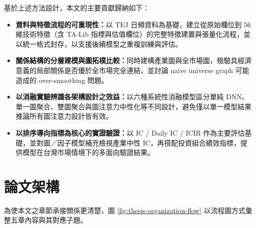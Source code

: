 基於上述方法設計，本文的主要貢獻歸納如下：
\begin{itemize}
    \item \textbf{資料與特徵流程的可重現性：}以 TEJ 日頻資料為基礎，建立從原始欄位到 56 維技術特徵（含 TA-Lib 指標與估值欄位）的完整特徵建置與張量化流程，並以統一格式封存，以支援後續模型之重複訓練與評估。
    \item \textbf{關係結構的分層建模與圖拓樸比較：}同時建構產業圖與全市場圖，檢驗具經濟意義的局部關係是否優於全市場完全連結，並討論 naive universe graph 可能造成的 over-smoothing 問題。
    \item \textbf{以消融實驗辨識各架構設計之效益：}以六種系統性消融模型區分單純 DNN、單一圖聚合、雙圖聚合與圖注意力中性化等不同設計，避免僅以單一模型結果推論所有圖注意力設計皆有效。
    \item \textbf{以排序導向指標為核心的實證驗證：}以 IC / Daily IC / ICIR 作為主要評估基礎，並對圖／因子模型補充檢視產業中性 IC，再搭配投資組合績效指標，提供模型在台灣市場情境下的多面向驗證結果。
\end{itemize}

\section{論文架構}
\label{sec:organization}

為使本文之章節承接關係更清楚，圖 \ref{fig:thesis-organization-flow} 以流程圖方式彙整五章內容與其對應子題。

